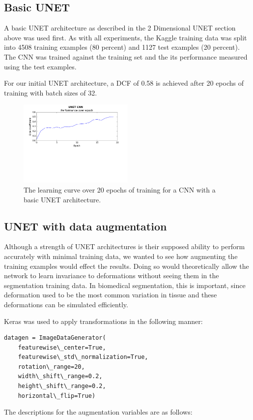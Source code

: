 \documentclass[letterpaper]{article}
\begin{document}
\subsection{Basic UNET}
A basic UNET architecture as described in the 2 Dimensional UNET section above was used first. As with all experiments, the Kaggle training data was split into 4508 training examples (80 percent) and 1127 test examples (20 percent).  The CNN was trained against the training set and the its performance measured using the test examples. 

For our initial UNET architecture, a DCF of 0.58 is achieved after 20 epochs of training with batch sizes of 32. 

 \begin{figure}[H]
  \centerline{\includegraphics[width=0.5\textwidth]{Plots/UNETSimple20.png}}
  \caption{The learning curve over 20 epochs of training for a CNN with a basic UNET architecture.}
  \label{fig:unet3}
\end{figure}

\subsection{UNET with data augmentation}

Although a strength of UNET architectures is their supposed ability to perform accurately with minimal training data, we wanted to see how augmenting the training examples would effect the results. Doing so would theoretically allow the network to learn invariance to deformations without seeing them in the segmentation training data. In biomedical segmentation, this is important, since deformation used to be the most common variation in tissue and these deformations can be simulated efficiently. 

Keras was used to apply transformations in the following manner:

\begin{lstlisting}
datagen = ImageDataGenerator(
    featurewise\_center=True,
    featurewise\_std\_normalization=True,
    rotation\_range=20,
    width\_shift\_range=0.2,
    height\_shift\_range=0.2,
    horizontal\_flip=True)
\end{lstlisting}
The descriptions for the augmentation variables are as follows:
\end{document}
